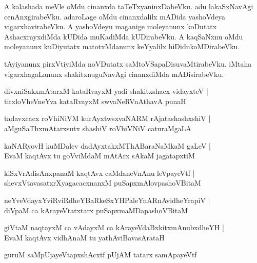 \documentclass{article}
\begin{document}
\begin{mn}%
A kalashada meVle oMdu cinanxda taTeTxyaninxDabeVku. adu lakaSxNavAgi cenAnxgirabeVku. adaroLage 
oMdu cinanxdalilx mADida yashoVdeya vigarxhavirabeVku. A yashoVdeyu maganige moleyanunx koDutatx 
AshacxrayxdiMda kUDida muKadiMda kUDirabeVku. A kaqSaNxnu oMdu moleyanunx kuDiyutatx matotxMdanunx 
keYyalilx hiDidukoMDirabeVku.
\end{mn}

\begin{mn}%
tAyiyanunx pirxVtiyiMda noVDutatx saMtoVSapaDisuvaMtirabeVku. iMtaha vigarxhagaLanunx 
shakitxnuguNavAgi cinanxdiMda mADisirabeVku.
\end{mn}

\begin{mn}%
divxniSakxmAtarxM kataRvayxM yadi shakitxshacx vidayxteV |\\
tirxloVheVneYva kataRvayxM swvaNeRVnAthavA punaH
\end{mn}

\begin{mn}%
tadavxcacx roVhiNiVM kurAyxtwsxvaNARM rAjatashashxshiV |\\
aMguSaThxmAtarxsutx shashiV roVhiVNiV caturaMgaLA 
\end{mn}

\begin{mn}%
kaNARyovH kuMDalev dadAyxtakxMThABaraNaMkaM gaLeV |\\
EvaM kaqtAvx tu goVviMdaM mAtArx sAkaM jagatapxtiM 
\end{mn}

\begin{mn}%
kiSxVrAdisAnxpanaM kaqtAvx caMdaneVnAnu leVpayeVtf |\\
shevxVtavasatxrXyagacacxnanxM puSapxmAlovpashoVBitaM 
\end{mn}

\begin{mn}%
neYveVdayxYviRviRdheYBaRkeSxYHPaleYnARnAvidheYrapiV |\\
diVpaM ca kArayeVtatxtarx puSapxmaMDapashoVBitaM
\end{mn}

\begin{mn}%
giVtaM naqtayxM ca vAdayxM ca kArayeVdaBxkitxmAnubxdheYH |\\
EvaM kaqtAvx vidhAnaM tu yathAviBavasArataH 
\end{mn}

\begin{mn}%
guruM saMpUjayeVtapxshAcxtf pUjAM tatarx samApayeVtf 
\end{mn}
\end{document}
